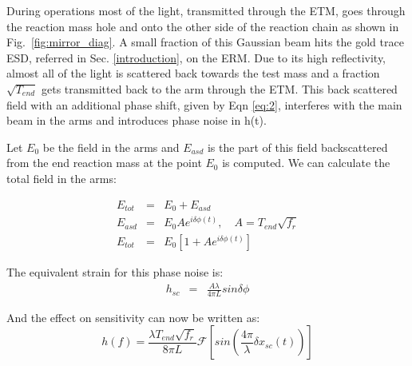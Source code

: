 \documentclass[12pt]{iopart}
\begin{document}
During operations most of the light, transmitted through the ETM, goes through the reaction mass hole and onto the other side of the reaction chain as shown in Fig.~\ref{fig:mirror_diag}. A small fraction of this Gaussian beam hits the gold trace ESD, referred in Sec. \ref{introduction}, on the ERM. Due to its high reflectivity, almost all of the light is scattered back towards the test mass and a fraction $\sqrt{T_{end}}$ gets transmitted back to the arm through the ETM. This back scattered field with an additional phase shift, given by Eqn \ref{eq:2}, interferes with the main beam in the arms and introduces phase noise in h(t).
\par
Let $E_{0}$ be the field in the arms and $E_{asd}$ is the part of this field backscattered from the end reaction mass at the point $E_{0}$ is computed. We can calculate the total field in the arms:

\begin{eqnarray}
    E_{tot} & = & E_{0} + E_{asd} \label{eq:4} \\
    E_{asd} & = & E_{0}Ae^{i{\delta}{\phi}(t)} ,\quad A = T_{end}\sqrt{f_{r}}  \label{eq:5} \\ 
    E_{tot} & = & E_{0}[1 + Ae^{i{\delta}{\phi}(t)}]  \label{eq:6}
\end{eqnarray}


The equivalent strain for this phase noise is:
\begin{eqnarray}
     h_{sc} & = & \frac{A{\lambda}}{4{\pi}L}sin{\delta}{\phi}  \label{eq:7}
\end{eqnarray}
   

And the effect on sensitivity can now be written as:
\begin{equation}
    h(f) = \frac{\lambda T_{end}\sqrt{f_{r}}}{8{\pi}L}\mathcal{F}[sin(\frac{4{\pi}}{\lambda}{\delta x_{sc}(t)})]  \label{eq:8}
\end{equation}
\end{document}
